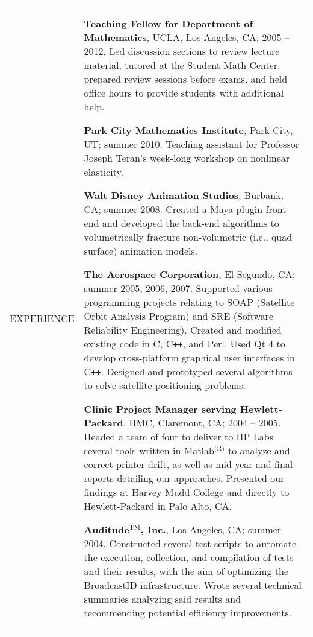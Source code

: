 \documentclass{article}
\begin{document}
\begin{center}
\vspace{\VS}

\begin{tabular}{@{}p{\CWa\columnwidth}@{}p{\CWb\columnwidth}@{}}
{\small EXPERIENCE} &
\begin{minipage}[t]{\CWb\columnwidth}
\par \textbf{Teaching Fellow for Department of Mathematics}, UCLA, Los Angeles, CA; 2005 -- 2012. Led discussion sections to review lecture material, tutored at the Student Math Center, prepared review sessions before exams, and held office hours to provide students with additional help. %
\vspace{\VSEX}
\par \textbf{Park City Mathematics Institute}, Park City, UT; summer 2010. Teaching assistant for Professor Joseph Teran's week-long workshop on nonlinear elasticity.
\vspace{\VSEX}
\par \textbf{Walt Disney Animation Studios}, Burbank, CA; summer 2008. Created a Maya plugin front-end and developed the back-end algorithms to volumetrically fracture non-volumetric (i.e., quad surface) animation models.
\vspace{\VSEX}
\par \textbf{The Aerospace Corporation}, El Segundo, CA; summer 2005, 2006, 2007. Supported various programming projects relating to SOAP (Satellite Orbit Analysis Program) and SRE (Software Reliability Engineering). Created and modified existing code in C, C\texttt{++}, and Perl. Used Qt 4 to develop cross-platform graphical user interfaces in C\texttt{++}. Designed and prototyped several algorithms to solve satellite positioning problems.
\vspace{\VSEX}
\par \textbf{Clinic Project Manager serving Hewlett-Packard}, HMC, Claremont, CA; 2004 -- 2005. Headed a team of four to deliver to HP Labs several tools written in Matlab$^{\text{(R)}}$ to analyze and correct printer drift, as well as mid-year and final reports detailing our approaches. Presented our findings at Harvey Mudd College and directly to Hewlett-Packard in Palo Alto, CA.
\vspace{\VSEX}
\par \textbf{Auditude$^{\text{TM}}$, Inc.}, Los Angeles, CA; summer 2004. Constructed several test scripts to automate the execution, collection, and compilation of tests and their results, with the aim of optimizing the BroadcastID infrastructure. Wrote several technical summaries analyzing said results and recommending potential efficiency improvements.

\end{minipage}
\end{tabular}
\end{center}
\end{document}
